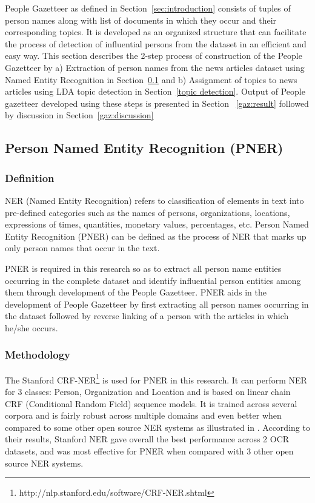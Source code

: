 People Gazetteer as defined in Section~\ref{sec:introduction} consists of tuples of person names along with list of documents in which they occur and their corresponding topics. It is developed as an organized structure that can facilitate the process of detection of influential persons from the dataset in an efficient and easy way. This section describes the 2-step process of construction of the People Gazetteer by
a) Extraction of person names from the news articles dataset using Named Entity Recognition in  Section~\ref{ner} and
b) Assignment of topics to news articles using LDA topic detection in  Section~\ref{topic detection}.
Output of People gazetteer developed using these steps is presented in Section ~\ref{gaz:result} followed by discussion in Section~\ref{gaz:discussion}

\subsection{Person Named Entity Recognition (PNER)}
\label{ner}


\subsubsection{Definition}
NER (Named Entity Recognition) refers to classification of elements in text into pre-defined categories such as the names of persons, organizations, locations, expressions of times, quantities, monetary values, percentages, etc. 
Person Named Entity Recognition (PNER) can be defined as the process of NER that marks up only person names that occur in the text.

PNER is required in this research so as to extract all person name entities occurring in the complete dataset and identify influential person entities among them through development of the People Gazetteer. 
PNER aids in the development of People Gazetteer by first extracting all person names occurring in the dataset followed by reverse linking of a person with the articles in which he/she occurs.

\subsubsection{Methodology}

The Stanford CRF-NER\footnote{http://nlp.stanford.edu/software/CRF-NER.shtml} is used for PNER in this research. It can perform NER for 3 classes: Person, Organization and Location and is based on linear chain CRF (Conditional Random Field) sequence models. It is trained across several corpora and is fairly robust across multiple domains and even better when compared to some other open source NER systems as illustrated in \cite{rodriquez2012comparison}. According to their results, Stanford NER gave overall the best performance across 2 OCR datasets, and was most effective for PNER when compared with 3 other open source NER systems.

